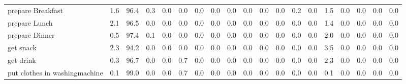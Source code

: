 \documentclass{article}
\begin{document}
\begin{sideways}
\begin{tabular}{lrrrrrrrrrrrrrrrrrr}
prepare Breakfast             &         1.6 &               96.4 &           0.3 &                          0.0 &                0.0 &                0.0 &                        0.0 &          0.0 &              0.0 &                0.0 &                    0.0 &                      0.2 &                  0.0 &                   1.5 &              0.0 &              0.0 &                                  0.0 &          0.0 \\
prepare Lunch                 &         2.1 &               96.5 &           0.0 &                          0.0 &                0.0 &                0.0 &                        0.0 &          0.0 &              0.0 &                0.0 &                    0.0 &                      0.0 &                  0.0 &                   1.4 &              0.0 &              0.0 &                                  0.0 &          0.0 \\
prepare Dinner                &         0.5 &               97.4 &           0.1 &                          0.0 &                0.0 &                0.0 &                        0.0 &          0.0 &              0.0 &                0.0 &                    0.0 &                      0.0 &                  0.0 &                   2.0 &              0.0 &              0.0 &                                  0.0 &          0.0 \\
get snack                     &         2.3 &               94.2 &           0.0 &                          0.0 &                0.0 &                0.0 &                        0.0 &          0.0 &              0.0 &                0.0 &                    0.0 &                      0.0 &                  0.0 &                   3.5 &              0.0 &              0.0 &                                  0.0 &          0.0 \\
get drink                     &         0.3 &               96.7 &           0.0 &                          0.0 &                0.7 &                0.0 &                        0.0 &          0.0 &              0.0 &                0.0 &                    0.0 &                      0.0 &                  0.0 &                   2.3 &              0.0 &              0.0 &                                  0.0 &          0.0 \\
put clothes in washingmachine &         0.1 &               99.0 &           0.0 &                          0.0 &                0.7 &                0.0 &                        0.0 &          0.0 &              0.0 &                0.0 &                    0.0 &                      0.0 &                  0.0 &                   0.1 &              0.0 &              0.0 &                                  0.0 &          0.0 \\

\end{tabular}
\end{sideways}
\end{document}
